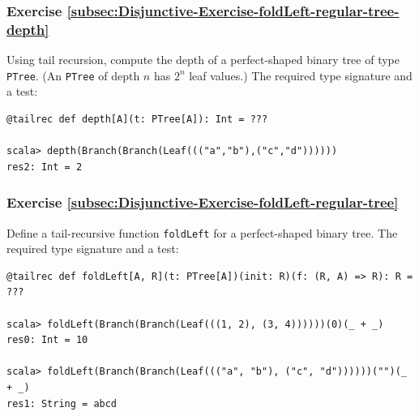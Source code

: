\subsubsection{Exercise \label{subsec:Disjunctive-Exercise-foldLeft-regular-tree-depth}\ref{subsec:Disjunctive-Exercise-foldLeft-regular-tree-depth}}

Using tail recursion, compute the depth of a perfect-shaped binary
tree of type \lstinline!PTree!. (An \lstinline!PTree! of depth $n$
has $2^{n}$ leaf values.) The required type signature and a test:
\begin{lstlisting}
@tailrec def depth[A](t: PTree[A]): Int = ???

scala> depth(Branch(Branch(Leaf((("a","b"),("c","d"))))))
res2: Int = 2
\end{lstlisting}

\subsubsection{Exercise \label{subsec:Disjunctive-Exercise-foldLeft-regular-tree}\ref{subsec:Disjunctive-Exercise-foldLeft-regular-tree}}

Define a tail-recursive function \lstinline!foldLeft! for a perfect-shaped
binary tree. The required type signature and a test:
\begin{lstlisting}
@tailrec def foldLeft[A, R](t: PTree[A])(init: R)(f: (R, A) => R): R = ???

scala> foldLeft(Branch(Branch(Leaf(((1, 2), (3, 4))))))(0)(_ + _)
res0: Int = 10

scala> foldLeft(Branch(Branch(Leaf((("a", "b"), ("c", "d"))))))("")(_ + _)
res1: String = abcd
\end{lstlisting}

